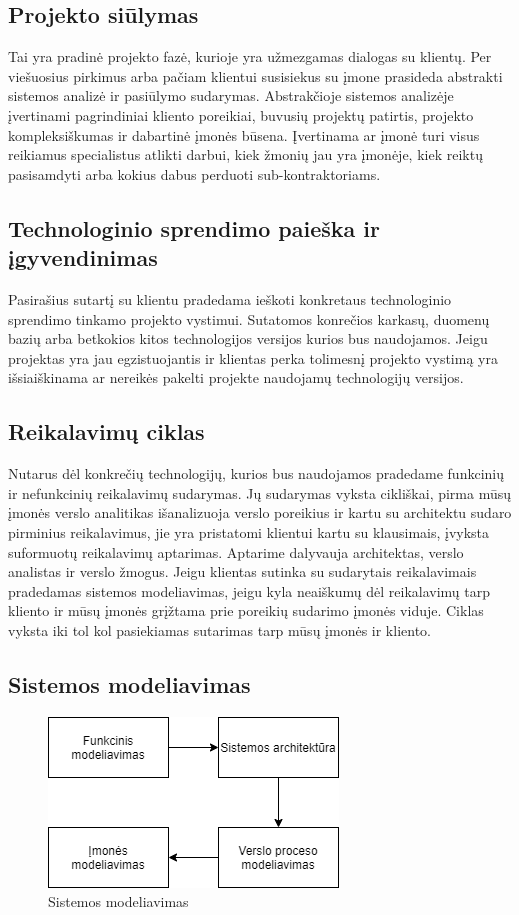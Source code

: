 \documentclass{VUMIFPSkursinis}
\begin{document}
	\subsection{Projekto siūlymas}
		Tai yra pradinė projekto fazė, kurioje yra užmezgamas dialogas su klientų. Per viešuosius pirkimus arba pačiam klientui susisiekus su įmone prasideda abstrakti sistemos analizė ir pasiūlymo sudarymas. Abstrakčioje sistemos analizėje įvertinami pagrindiniai kliento poreikiai, buvusių projektų patirtis, projekto kompleksiškumas ir dabartinė įmonės būsena. Įvertinama ar įmonė turi visus reikiamus specialistus atlikti darbui, kiek žmonių jau yra įmonėje, kiek reiktų pasisamdyti arba kokius dabus perduoti sub-kontraktoriams.
	\subsection{Technologinio sprendimo paieška ir įgyvendinimas}
		Pasirašius sutartį su klientu pradedama ieškoti konkretaus technologinio sprendimo tinkamo projekto vystimui. Sutatomos konrečios karkasų, duomenų bazių arba betkokios kitos technologijos versijos kurios bus naudojamos. Jeigu projektas yra jau egzistuojantis ir klientas perka tolimesnį projekto vystimą yra išsiaiškinama ar nereikės pakelti projekte naudojamų technologijų versijos.
	\subsection{Reikalavimų ciklas}
		Nutarus dėl konkrečių technologijų, kurios bus naudojamos pradedame funkcinių ir nefunkcinių reikalavimų sudarymas. Jų sudarymas vyksta cikliškai, pirma mūsų įmonės verslo analitikas išanalizuoja verslo poreikius ir kartu su architektu sudaro pirminius reikalavimus, jie yra pristatomi klientui kartu su klausimais, įvyksta suformuotų reikalavimų aptarimas. Aptarime dalyvauja architektas, verslo analistas ir verslo žmogus. Jeigu klientas sutinka su sudarytais reikalavimais pradedamas sistemos modeliavimas, jeigu kyla neaiškumų dėl reikalavimų tarp kliento ir mūsų įmonės grįžtama prie poreikių sudarimo įmonės viduje. Ciklas vyksta iki tol kol pasiekiamas sutarimas tarp mūsų įmonės ir kliento.
	\subsection{Sistemos modeliavimas}
	\begin{figure}[H]
	\centering
	\includegraphics[scale=0.7]{img/SistemosModeliavimas}
	\caption{Sistemos modeliavimas} %
	\label{img:mlp}
	\end{figure}
\end{document}
